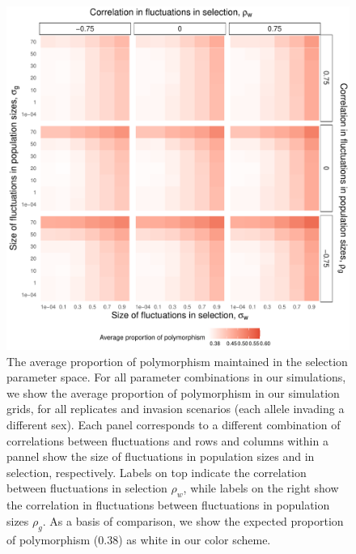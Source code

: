 \documentclass[12pt]{article}
\begin{document}
\begin{figure}[H]
  \centerline{\includegraphics[width=1\textwidth]{heat_map.pdf}}
  \caption{The average proportion of polymorphism maintained in the selection parameter space. For all parameter combinations in our simulations, we show the average proportion of polymorphism in our simulation grids, for all replicates and invasion scenarios (each allele invading a different sex). Each panel corresponds to a different combination of correlations between fluctuations and rows and columns within a pannel show the size of fluctuations in population sizes and in selection, respectively. Labels on top indicate the correlation between fluctuations in selection $\rho_{w}$, while labels on the right show the correlation in fluctuations between fluctuations in population sizes $\rho_{g}$.  As a basis of comparison, we show the expected proportion of polymorphism ($ 0.38$) as white in our color scheme.  }
    \label{fig:heatmap}
\end{figure}
\end{document}
